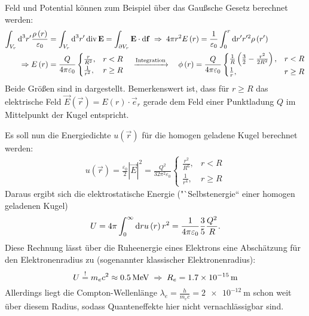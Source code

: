 Feld und Potential können zum Beispiel über das Gaußsche Gesetz berechnet werden:
\begin{align*}
	\int _{{V_{r}}}\text{d} ^{3}r'\frac{\rho \left(r\right)}{\varepsilon _{0}}&=\int _{{V_{r}}}\text{d} ^{3}r'\operatorname{div} \mathbf{E}=\int _{\partial {V_{r}}}\mathbf{E}\cdot \text{d} \mathbf{f}\;\Rightarrow\; 4\pi r^{2}E\left(r\right)=\frac{1}{\varepsilon _{0}}\int _{0}^{r}\text{d} r'r'^{2}\rho \left(r'\right) \\
	\Rightarrow E\left(r\right)&=\frac{Q}{4\pi \varepsilon _{0}}
	\begin{cases} \frac{r}{R^{2}}, & r<R     \\
          \frac{1}{r^{2}}, & r\geq R
	\end{cases} \quad\xrightarrow{\text{Integration}}\quad \phi \left(r\right)=\frac{Q}{4\pi \varepsilon _{0}}
	\begin{cases} \frac{1}{R}\left(\frac{3}{2}-\frac{r^{2}}{2R^{2}}\right), & r<R     \\
          \frac{1}{r},  & r\geq R
	\end{cases}
\end{align*}
Beide Größen sind in  dargestellt. Bemerkenswert ist, dass für $r\geq R$ das elektrische Feld $\vec {E}\left(\vec {r}\right)=E\left(r\right)\cdot \vec {e}_{r}$ gerade dem Feld einer Punktladung $Q$ im Mittelpunkt der Kugel entspricht.

Es soll nun die Energiedichte $u\left(\vec {r}\right)$ für die homogen geladene Kugel berechnet werden:
\begin{align*}
	u\left(\vec {r}\right)=\frac{\varepsilon _{0}}{2}\left| \vec {E}\right| ^{2}=\frac{Q^{2}}{32\pi ^{2}\varepsilon _{0}}\begin{cases} \frac{r^{2}}{R^{6}}, & r<R     \\
              \frac{1}{r^{4}},     & r\geq R
    \end{cases}
\end{align*}
Daraus ergibt sich die elektrostatische Energie ("`Selbstenergie`` einer homogen geladenen Kugel)
\begin{equation*}
	U=4\pi \int _{0}^{\infty }\text{d} ru\left(r\right)r^{2}=\frac{1}{4\pi \varepsilon _{0}}\frac{3}{5}\frac{Q^{2}}{R}.
\end{equation*}
Diese Rechnung lässt über die Ruheenergie eines Elektrons eine Abschätzung für den Elektronenradius zu (sogenannter klassischer Elektronenradius):
\begin{equation*}
	U\overset{!}{=} m_{e}c^{2}\approx \SI{0.5}{\mega\eV}\implication R_{e}= \SI{1,7e-15}{\m}
\end{equation*}
Allerdings liegt die Compton-Wellenlänge $\lambda _{e}=\frac{h}{m_{e}c}=\SI{2e-12}{\m}$ schon weit über diesem Radius, sodass Quanteneffekte hier nicht vernachlässigbar sind.



